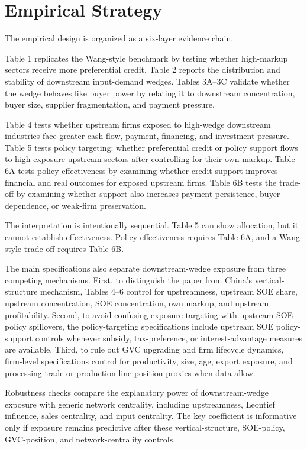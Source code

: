 \section{Empirical Strategy}

The empirical design is organized as a six-layer evidence chain.

Table 1 replicates the Wang-style benchmark by testing whether high-markup sectors receive more preferential credit. Table 2 reports the distribution and stability of downstream input-demand wedges. Tables 3A--3C validate whether the wedge behaves like buyer power by relating it to downstream concentration, buyer size, supplier fragmentation, and payment pressure.

Table 4 tests whether upstream firms exposed to high-wedge downstream industries face greater cash-flow, payment, financing, and investment pressure. Table 5 tests policy targeting: whether preferential credit or policy support flows to high-exposure upstream sectors after controlling for their own markup. Table 6A tests policy effectiveness by examining whether credit support improves financial and real outcomes for exposed upstream firms. Table 6B tests the trade-off by examining whether support also increases payment persistence, buyer dependence, or weak-firm preservation.

The interpretation is intentionally sequential. Table 5 can show allocation, but it cannot establish effectiveness. Policy effectiveness requires Table 6A, and a Wang-style trade-off requires Table 6B.

The main specifications also separate downstream-wedge exposure from three competing mechanisms. First, to distinguish the paper from China's vertical-structure mechanism, Tables 4--6 control for upstreamness, upstream SOE share, upstream concentration, SOE concentration, own markup, and upstream profitability. Second, to avoid confusing exposure targeting with upstream SOE policy spillovers, the policy-targeting specifications include upstream SOE policy-support controls whenever subsidy, tax-preference, or interest-advantage measures are available. Third, to rule out GVC upgrading and firm lifecycle dynamics, firm-level specifications control for productivity, size, age, export exposure, and processing-trade or production-line-position proxies when data allow.

Robustness checks compare the explanatory power of downstream-wedge exposure with generic network centrality, including upstreamness, Leontief influence, sales centrality, and input centrality. The key coefficient is informative only if exposure remains predictive after these vertical-structure, SOE-policy, GVC-position, and network-centrality controls.
